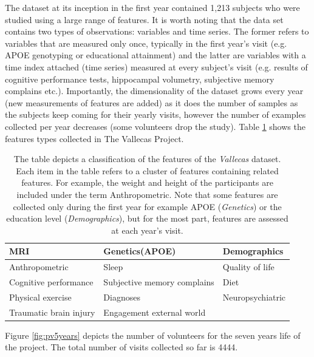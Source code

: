 \documentclass[11pt]{article}
\theoremstyle{definition}
\theoremstyle{remark}
\begin{document}
The dataset at its inception in the first year contained 1,213 subjects who were studied using a large range of features. It is worth noting that the data set contains two types of observations: variables and time series. The former refers to variables that are measured only once, typically in the first year's visit (e.g. APOE genotyping or educational attainment) and the latter are variables with a time index attached (time series) measured at every subject's visit (e.g. results of cognitive performance tests, hippocampal volumetry, subjective memory complains etc.).
Importantly, the dimensionality of the dataset grows every year (new measurements of features are added) as it does the number of samples as the subjects keep coming for their yearly visits, however the number of examples collected per year decreases (some volunteers drop the study). 
Table \ref{tab:vallecasvars} shows the features types collected in The Vallecas Project.

\begin{table}
\begin{tabular}{ |p{4.4cm}|p{4.4cm}|p{4.4cm}| }
\hline
\hline
MRI & Genetics(APOE) & Demographics  \\
\hline
Anthropometric & Sleep & Quality of life \\
\hline
Cognitive performance & Subjective memory complains & Diet \\
\hline
Physical exercise & Diagnoses & Neuropsychiatric \\
\hline
Traumatic brain injury & Engagement external world &  \\
\hline

\hline
\end{tabular}
\caption{The table depicts a classification of the features of the \emph{Vallecas} dataset. Each item in the table refers to a cluster of features containing related features. For example, the weight and height of the participants are included under the term Anthropometric.
Note that some features are collected only during the first year for example APOE (\emph{Genetics}) or the education level (\emph{Demographics}), but for the most part, features are assessed at each year's visit.}
\label{tab:vallecasvars}
\end{table}

Figure \ref{fig:pv5years} depicts the number of volunteers for the seven years life of the project. The total number of visits collected so far is 4444. 
\end{document}
